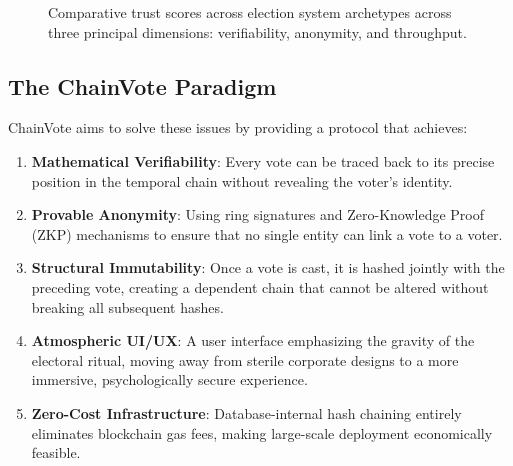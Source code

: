 \documentclass[journal,10pt,twocolumn]{IEEEtran}
\begin{document}
\begin{figure}[htbp]
\centering
{}
\caption{Comparative trust scores across election system archetypes across three principal dimensions: verifiability, anonymity, and throughput.}
\label{fig:trust_scores}
\end{figure}

\subsection{The ChainVote Paradigm}

ChainVote aims to solve these issues by providing a protocol that achieves:
\begin{enumerate}
    \item \textbf{Mathematical Verifiability}: Every vote can be traced back to its precise position in the temporal chain without revealing the voter's identity.
    \item \textbf{Provable Anonymity}: Using ring signatures and Zero-Knowledge Proof (ZKP) mechanisms to ensure that no single entity can link a vote to a voter.
    \item \textbf{Structural Immutability}: Once a vote is cast, it is hashed jointly with the preceding vote, creating a dependent chain that cannot be altered without breaking all subsequent hashes.
    \item \textbf{Atmospheric UI/UX}: A user interface emphasizing the gravity of the electoral ritual, moving away from sterile corporate designs to a more immersive, psychologically secure experience.
    \item \textbf{Zero-Cost Infrastructure}: Database-internal hash chaining entirely eliminates blockchain gas fees, making large-scale deployment economically feasible.
\end{enumerate}
\end{document}
